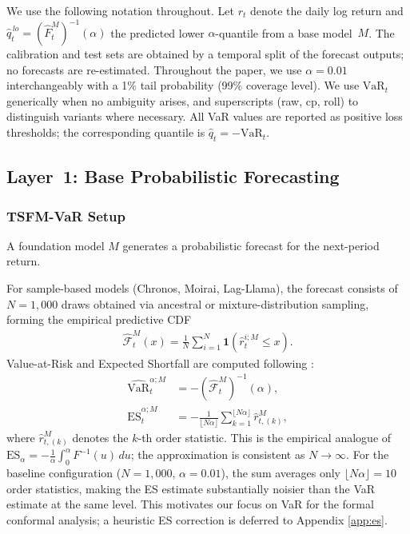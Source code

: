 \documentclass[preprint,11pt,authoryear]{elsarticle}
\newcommand{\VaR}{\mathrm{VaR}}
\newcommand{\ES}{\mathrm{ES}}
\newcommand{\1}{\boldsymbol{1}}
\newcommand{\Fhat}{\hat{\mathcal{F}}}
\begin{document}
	We use the following notation throughout. Let $r_t$
	denote the daily log return and
	$\hat{q}_t^{\,lo} = (\hat{F}_t^M)^{-1}(\alpha)$ the
	predicted lower $\alpha$-quantile from a base model~$M$.
	The calibration and test sets are obtained by a temporal
	split of the forecast outputs; no forecasts are
	re-estimated.
	Throughout the paper, we use $\alpha = 0.01$ interchangeably with a 1\% tail probability (99\% coverage level).
	We use $\VaR_t$ generically when no ambiguity arises, and superscripts (raw, cp, roll) to distinguish variants where necessary. All VaR values are reported as positive loss thresholds; the corresponding quantile is $\hat{q}_t = -\VaR_t$.

	\subsection{Layer~1: Base Probabilistic Forecasting}
	\label{sec:layer1}
	
	\subsubsection{TSFM-VaR Setup}
	\label{sec:setup}
	
	A foundation model $M$ generates a probabilistic forecast for
	the next-period return.
	
	For sample-based models (Chronos,
	Moirai, Lag-Llama), the forecast consists of $N=1{,}000$ draws
	obtained via ancestral or mixture-distribution sampling,
	forming the empirical predictive CDF
	\begin{align}
		\Fhat_t^M(x) = \frac{1}{N}\sum_{i=1}^{N}
		\1(\hat{r}_t^{i;M}\leq x).
	\end{align}
	Value-at-Risk and Expected Shortfall are computed following
	\citet{pele2025llmvar}:
	\begin{align}
		\widehat{\VaR}_t^{\alpha;M}
		&= -(\Fhat_t^M)^{-1}(\alpha), \\
		\widehat{\ES}_t^{\alpha;M}
		&= -\frac{1}{\lfloor N\alpha\rfloor}
		\sum_{k=1}^{\lfloor N\alpha\rfloor}\hat{r}_{t,(k)}^M,
	\end{align}
	where $\hat{r}_{t,(k)}^M$ denotes the $k$-th order statistic.
	This is the empirical analogue of
	$\ES_\alpha = -\frac{1}{\alpha}\int_0^\alpha F^{-1}(u)\,du$;
	the approximation is consistent as $N \to \infty$.
	For the baseline configuration ($N = 1{,}000$,
	$\alpha = 0.01$), the sum averages only
	$\lfloor N\alpha \rfloor = 10$ order statistics, making
	the ES estimate substantially noisier than the VaR
	estimate at the same level. This motivates our focus
	on VaR for the formal conformal analysis; a heuristic
	ES correction is deferred to Appendix \ref{app:es}.
	
\end{document}

